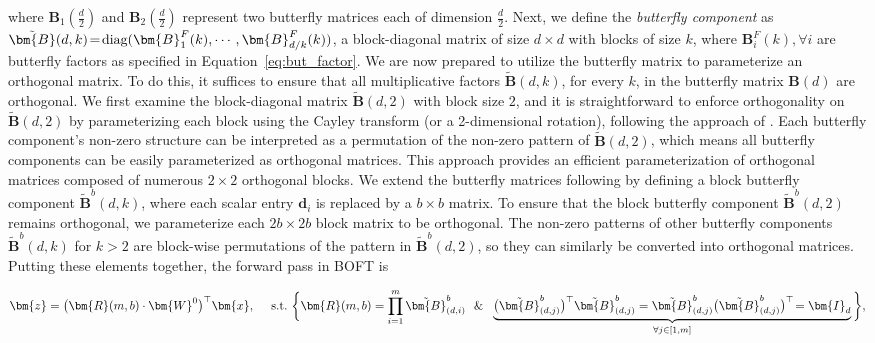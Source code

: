 where $\bm{B}_1(\frac{d}{2})$ and $\bm{B}_2(\frac{d}{2})$ represent two butterfly matrices each of dimension $\frac{d}{2}$. Next, we define the \emph{butterfly component} as $\thickmuskip=2mu \medmuskip=2mu \tilde{\bm{B}}(d,k)=\text{diag}(\bm{B}^F_1(k),\cdots,\bm{B}^F_{d/k}(k))$, a block-diagonal matrix of size $d \times d$ with blocks of size $k$, where $\bm{B}^F_i(k), \forall i$ are butterfly factors as specified in Equation~\ref{eq:but_factor}. We are now prepared to utilize the butterfly matrix to parameterize an orthogonal matrix. To do this, it suffices to ensure that all multiplicative factors $\tilde{\bm{B}}(d,k)$, for every $k$, in the butterfly matrix $\bm{B}(d)$ are orthogonal. We first examine the block-diagonal matrix $\tilde{\bm{B}}(d,2)$ with block size $2$, and it is straightforward to enforce orthogonality on $\tilde{\bm{B}}(d,2)$ by parameterizing each block using the Cayley transform (or a 2-dimensional rotation), following the approach of \cite{liu2021orthogonal,qiu2023controlling}. Each butterfly component's non-zero structure can be interpreted as a permutation of the non-zero pattern of $\tilde{\bm{B}}(d,2)$, which means all butterfly components can be easily parameterized as orthogonal matrices. This approach provides an efficient parameterization of orthogonal matrices composed of numerous $2 \times 2$ orthogonal blocks. We extend the butterfly matrices following \cite{chen2022pixelated} by defining a block butterfly component $\tilde{\bm{B}}^b(d,k)$, where each scalar entry $\bm{d}_i$ is replaced by a $b \times b$ matrix. To ensure that the block butterfly component $\tilde{\bm{B}}^b(d,2)$ remains orthogonal, we parameterize each $2b \times 2b$ block matrix to be orthogonal. The non-zero patterns of other butterfly components $\tilde{\bm{B}}^b(d,k)$ for $k>2$ are block-wise permutations of the pattern in $\tilde{\bm{B}}^b(d,2)$, so they can similarly be converted into orthogonal matrices. Putting these elements together, the forward pass in BOFT is

\begin{equation}
    \begin{aligned}\nonumber
    \bm{z}=\big(\bm{R}(m,b)\cdot\bm{W}^0\big)^\top\bm{x},~~~~\text{s.t.}~\bigg{\{}\bm{R}(m,b)=\prod_{i=1}^m \tilde{\bm{B}}^b_{(d,i)}~~\&~~\underbrace{\big(\tilde{\bm{B}}^b_{(d,j)}\big)^\top\tilde{\bm{B}}^b_{(d,j)}=\tilde{\bm{B}}^b_{(d,j)}\big(\tilde{\bm{B}}^b_{(d,j)}\big)^\top\!=\bm{I}_d}_{\forall j\in [1, m]}\bigg{\}},
    \end{aligned}
\end{equation}

